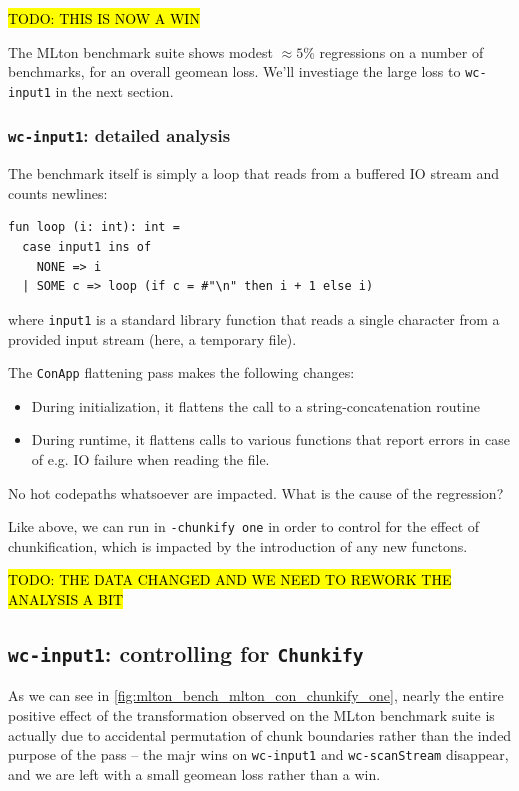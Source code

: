 \documentclass[leqno,11pt]{article}
\begin{document}
\hl{TODO: THIS IS NOW A WIN}

The MLton benchmark suite shows modest $\approx 5\%$ regressions on a number of
benchmarks, for an overall geomean loss. We'll investiage the large loss to
\texttt{wc-input1} in the next section.

\subsubsection{\texttt{wc-input1}: detailed analysis}

The benchmark itself is simply a loop that reads from a buffered IO stream and
counts newlines:
\begin{verbatim}
fun loop (i: int): int =
  case input1 ins of
    NONE => i
  | SOME c => loop (if c = #"\n" then i + 1 else i)
\end{verbatim}
where \texttt{input1} is a standard library function that reads a single
character from a provided input stream (here, a temporary file).

The \texttt{ConApp} flattening pass makes the following changes:
\begin{itemize}
\item During initialization, it flattens the call to a string-concatenation routine
\item During runtime, it flattens calls to various functions that report errors
  in case of e.g. IO failure when reading the file.
\end{itemize}
No hot codepaths whatsoever are impacted. What is the cause of the regression?

Like above, we can run in \texttt{-chunkify one} in order to control for the
effect of chunkification, which is impacted by the introduction of any new
functons.

\hl{TODO: THE DATA CHANGED AND WE NEED TO REWORK THE ANALYSIS A BIT}

\FloatBarrier
\subsection{\texttt{wc-input1}: controlling for \texttt{Chunkify}}

As we can see in \cref{fig:mlton_bench_mlton_con_chunkify_one}, nearly the
entire positive effect of the transformation observed on the MLton benchmark
suite is actually due to accidental permutation of chunk boundaries rather than
the inded purpose of the pass -- the majr wins on \texttt{wc-input1} and
\texttt{wc-scanStream} disappear, and we are left with a small geomean loss
rather than a win.
\end{document}
